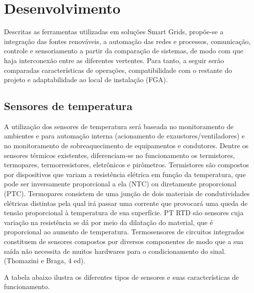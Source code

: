 \section{Desenvolvimento}
Descritas as ferramentas utilizadas em soluções Smart Grids, propõe-se a integração das fontes renováveis, a automação das redes e processos, comunicação, controle e sensoriamento a partir da comparação de sistemas, de modo com que haja interconexão entre as diferentes vertentes. Para tanto, a seguir serão comparadas características de operações, compatibilidade com o restante do projeto e adaptabilidade ao local de instalação (FGA).

\subsection{Sensores de temperatura}
A utilização dos sensores de temperatura será baseada no monitoramento de ambientes e para automação interna (acionamento de exaustores/ventiladores) e no monitoramento de sobreaquecimento de equipamentos e condutores. Dentre os sensores térmicos existentes, diferenciam-se no funcionamento os termistores, termopares, termorresistores, eletrônicos e pirômetros. Termistores são compostos por dispositivos que variam a resistência elétrica em função da temperatura, que pode ser inversamente proporcional a ela (NTC) ou diretamente proporcional (PTC). Termopares consistem de uma junção de dois materiais de condutividades elétricas distintas pela qual irá passar uma corrente que provocará uma queda de tensão proporcional à temperatura de sua superfície. PT RTD são sensores cuja variação na resistência se dá por meio da dilatação do material, que é proporcional ao aumento de temperatura. Termosensores de circuitos integrados constituem de sensores compostos por diversos componentes de modo que a sua saída não necessita de muitos hardwares para o condicionamento do sinal. (Thomazini e Braga, 4 ed).

A tabela abaixo ilustra os diferentes tipos de sensores e suas características de funcionamento.

